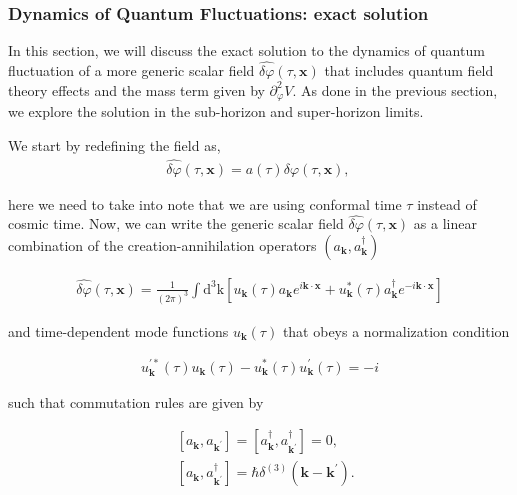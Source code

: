 \subsubsection{Dynamics of Quantum Fluctuations: exact solution}

In this section, we will discuss the exact solution to the dynamics of quantum fluctuation of a more generic scalar field \(\hat{\delta \varphi}(\tau, \mathbf{x}) \)  that includes quantum field theory effects and the mass term given by $\partial_{\varphi}^{2} V$. As done in the previous section, we explore the solution in the sub-horizon and super-horizon limits.

We start by redefining the field as,
\begin{align}
    \hat{\delta \varphi}(\tau, \mathbf{x})=a(\tau) \delta \varphi(\tau, \mathbf{x}) ,\
\end{align}

here we need to take into note that we are using conformal time $\tau$  instead of cosmic time. Now, we can write the generic scalar field  $\hat{\delta \varphi}(\tau, \mathbf{x})$ as a linear combination of the creation-annihilation operators $\left(a_{\mathbf{k}}, a_{\mathbf{k}}^{\dagger}\right)$

\begin{align}
    \hat{\delta \varphi}(\tau, \mathbf{x})=\frac{1}{(2 \pi)^{3}} \int \mathrm{d}^{3} \mathrm{k}\left[u_{\mathbf{k}}(\tau) a_{\mathbf{k}} e^{i \mathbf{k} \cdot \mathbf{x}}+u_{\mathbf{k}}^{*}(\tau) a_{\mathbf{k}}^{\dagger} e^{-i \mathbf{k} \cdot \mathbf{x}}\right]
\end{align}

and time-dependent mode functions $u_{\mathbf{k}}(\tau)$ that obeys a normalization condition

\begin{align}
    u_{\mathbf{k}}^{\prime *}(\tau) u_{\mathbf{k}}(\tau)-u_{\mathbf{k}}^{*}(\tau) u_{\mathbf{k}}^{\prime}(\tau)= -i
\end{align}

such that commutation rules are given by


\begin{align}
    & {\left[a_{\mathbf{k}}, a_{\mathbf{k}^{\prime}}\right]=\left[a_{\mathbf{k}}^{\dagger}, a_{\mathbf{k}^{\prime}}^{\dagger}\right]=0,} \\
    & {\left[a_{\mathbf{k}}, a_{\mathbf{k}^{\prime}}^{\dagger}\right]=\hbar \delta^{(3)}\left(\mathbf{k}-\mathbf{k}^{\prime}\right) .}
\end{align}

